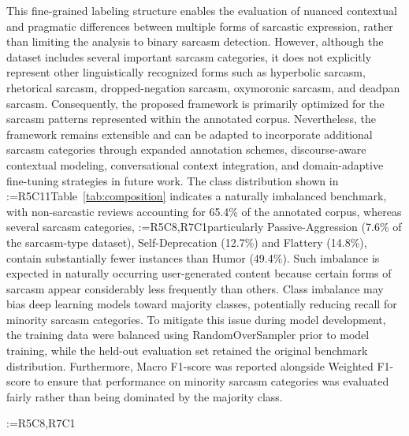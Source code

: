 \documentclass[a4paper,fleqn]{cas-sc}
\makeatletter
\newif\iftracked
\newcommand{\rv@setcolour}[1]{%
  \IfStrEq{#1}{R7C7}{\color{rvEdit}}{%
    \IfSubStr{#1}{R5}{\IfSubStr{#1}{R7}{\color{rvBoth}}{\color{rvFive}}}{\color{rvSeven}}}}
\newcommand{\rv@tag}[1]{\textsuperscript{\sffamily\bfseries\scriptsize[\StrSubstitute{#1}{,}{, }]}\,}
\newcommand{\rv@recordone}[1]{%
  \edef\rv@i{#1}%
  \ifcsdef{rv@n@\rv@i}{}{\csgdef{rv@n@\rv@i}{0}}%
  \csxdef{rv@n@\rv@i}{\the\numexpr\csuse{rv@n@\rv@i}+1\relax}%
  \begingroup\edef\@currentlabel{\rv@i}\label{rv:\rv@i:\csuse{rv@n@\rv@i}}\endgroup}
\newcommand{\rv@record}[1]{\@for\rv@id:=#1\do{\expandafter\rv@recordone\expandafter{\rv@id}}}
\DeclareRobustCommand{\rcdel}[2]{\rv@record{#1}\iftracked{\rv@setcolour{#1}\rv@tag{#1}\rv@strike{#2}}\else\unskip\fi}
\DeclareRobustCommand{\rcrep}[3]{\rv@record{#1}\iftracked{\rv@setcolour{#1}\rv@tag{#1}\rv@strike{#2} #3}\else#3\fi}
\makeatother
\begin{document}
This fine-grained labeling structure enables the evaluation of nuanced contextual and pragmatic differences between multiple forms of sarcastic expression, rather than limiting the analysis to binary sarcasm detection. However, although the dataset includes several important sarcasm categories, it does not explicitly represent other linguistically recognized forms such as hyperbolic sarcasm, rhetorical sarcasm, dropped-negation sarcasm, oxymoronic sarcasm, and deadpan sarcasm. Consequently, the proposed framework is primarily optimized for the sarcasm patterns represented within the annotated corpus. Nevertheless, the framework remains extensible and can be adapted to incorporate additional sarcasm categories through expanded annotation schemes, discourse-aware contextual modeling, conversational context integration, and domain-adaptive fine-tuning strategies in future work. The class distribution shown in \rcrep{R5C11}{Table 3}{Table~\ref{tab:composition}} indicates a naturally imbalanced benchmark, with non-sarcastic reviews accounting for 65.4\% of the annotated corpus, whereas several sarcasm categories, \rcrep{R5C8,R7C1}{particularly Self-Deprecation (2.6\%), Passive Aggression (4.4\%), and Flattery (5.1\%), contain substantially fewer training instances}{particularly Passive-Aggression (7.6\% of the sarcasm-type dataset), Self-Deprecation (12.7\%) and Flattery (14.8\%), contain substantially fewer instances than Humor (49.4\%)}. Such imbalance is expected in naturally occurring user-generated content because certain forms of sarcasm appear considerably less frequently than others. Class imbalance may bias deep learning models toward majority classes, potentially reducing recall for minority sarcasm categories. To mitigate this issue during model development, the training data were balanced using RandomOverSampler prior to model training, while the held-out evaluation set retained the original benchmark distribution. Furthermore, Macro F1-score was reported alongside Weighted F1-score to ensure that performance on minority sarcasm categories was evaluated fairly rather than being dominated by the majority class.

\rcdel{R5C8,R7C1}{One inconsistency in the label mapping should be reported explicitly rather than corrected silently. In the source publication that introduced this benchmark, the category Passive Aggression is reported with 439 instances and Self-Deprecation with 263 instances. In the label mapping used by the result files of the present study, the counts are associated with the categories in the opposite order, so that Self-Deprecation carries 439 instances and Passive-Aggression carries 263 instances. The class supports observed in the held-out test partitions, namely 65 and 40 instances respectively, are consistent with the mapping used in our result files. We have therefore reported the class names exactly as they appear in the experimental output rather than reassigning them, and we note that readers comparing the per-class results in Section 6 against the source publication should account for this discrepancy. Resolving which of the two mappings reflects the original annotation requires access to the original annotation records and is identified as an open item.}
\end{document}
